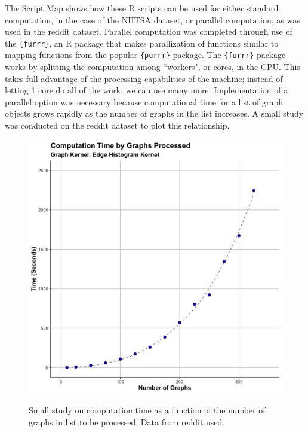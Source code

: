  The Script Map shows how these R scripts can be used for either standard computation, in the case of the NHTSA dataset, or parallel computation, as was used in the reddit dataset. Parallel computation was completed through use of the \texttt{\{furrr\}}, an R package that makes parallization of functions similar to mapping functions from the popular \texttt{\{purrr\}} package. The \texttt{\{furrr\}} package works by splitting the computation among ``workers", or cores, in the CPU. This takes full advantage of the processing capabilities of the machine; instead of letting 1 core do all of the work, we can use many more. Implementation of a parallel option was necessary because computational time for a list of graph objects grows rapidly as the number of graphs in the list increases. A small study was conducted on the reddit dataset to plot this relationship.
 
\begin{figure}
\includegraphics[width=6in]{Content/Images/edgeHistTimePlot.png}\\
\caption{Small study on computation time as a function of the number of graphs in list to be processed. Data from reddit used.}
\end{figure}
 
